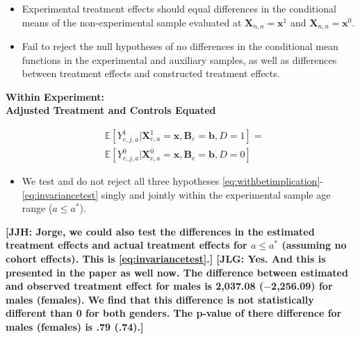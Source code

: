 \documentclass[static]{JJH-Beamer}
\begin{document}

\begin{itemize}
\item Experimental treatment effects should equal differences in the conditional means of the non-experimental sample evaluated at $\bm{X}_{n,a}=\bm{x}^{1}$ and $\bm{X}_{n,a}=\bm{x}^0$.
\item Fail to reject the null hypotheses of no differences in the conditional mean functions in the experimental and auxiliary samples, as well as differences between treatment effects and constructed treatment effects.
\end{itemize}

\begin{frame}

\begin{center}
\textbf{Within Experiment:}\\
\textbf{Adjusted Treatment and Controls Equated}
\end{center}

\begin{align}\label{eq:invariancetest}
&\mathbb{E} \left[ Y_{e,j,a}^1 | \bm{X}_{e,a}^1 = \bm{x}, \bm{B}_{e} = \bm{b}, D = 1   \right] =\nonumber \\
&\mathbb{E} \left[ Y_{e,j,a}^0 | \bm{X}_{e,a}^0 = \bm{x}, \bm{B}_{e} = \bm{b}, D = 0   \right]
\end{align}

\end{frame}

\begin{frame}

\begin{itemize}
\item We test and do not reject all three hypotheses \eqref{eq:withbetimplication}-\ref{eq:invariancetest} singly and jointly within the experimental sample age range ($a \leq a^*$).
\end{itemize}

\end{frame}

\textbf{[JJH: Jorge, we could also test the differences in the estimated treatment effects and actual treatment effects for $a \leq a^*$ (assuming no cohort effects). This is \eqref{eq:invariancetest}.] [JLG: Yes. And this is presented in the paper as well now. The difference between estimated and observed treatment effect for males is 2,037.08 ($-$2,256.09) for males (females). We find that this difference is not statistically different than 0 for both genders. The p-value of there difference for males (females) is .79 (.74).]}
\end{document}
